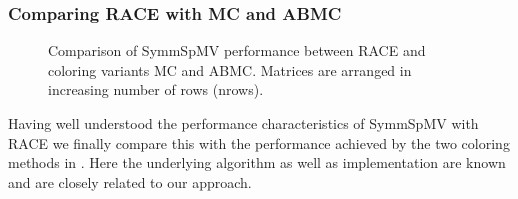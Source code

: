 \subsubsection{Comparing \acrshort{RACE} with \acrshort{MC} and \acrshort{ABMC}}
\begin{figure}[t]
	\centering
	\hspace{1em}
	\caption{Comparison of \acrshort{SymmSpMV} performance between \acrshort{RACE} and coloring variants \acrshort{MC} and \acrshort{ABMC}. Matrices are arranged in increasing number of rows (\acrshort{nrows}).}
	\label{fig:symm_spmv}
\end{figure}
%
Having well understood the performance characteristics of  \acrshort{SymmSpMV} with \acrshort{RACE} we finally compare this with the performance achieved by the two coloring methods in . Here the underlying algorithm as well as implementation are known and are closely related to our approach. 
